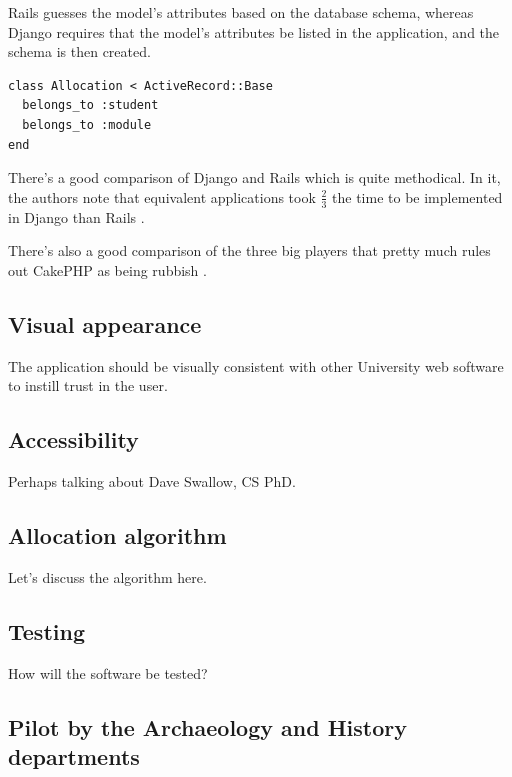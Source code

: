 \documentclass[]{scrartcl}
\begin{document}
Rails guesses the model's attributes based on the database schema, whereas Django requires that the model's attributes be listed in the application, and the schema is then created.

\begin{lstlisting}
class Allocation < ActiveRecord::Base
  belongs_to :student
  belongs_to :module
end
\end{lstlisting}

There's a good comparison of Django and Rails which is quite methodical. In it, the authors note that equivalent applications took $\frac{2}{3}$ the time to be implemented in Django than Rails \cite{RailsDjangoComparison_2007}.

There's also a good comparison of the three big players that pretty much rules out CakePHP as being rubbish \cite{EvalWebDevFrameworks_2009}.

\subsection{Visual appearance}

The application should be visually consistent with other University web software to instill trust in the user.


\subsection{Accessibility}

Perhaps talking about Dave Swallow, CS PhD.

\subsection{Allocation algorithm}

Let's discuss the algorithm here.

\subsection{Testing}

How will the software be tested?

\subsection{Pilot by the Archaeology and History departments}
\end{document}
